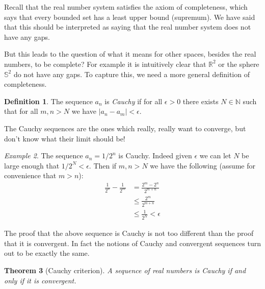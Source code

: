 \documentclass[11pt,oneside]{amsbook}
\newcommand{\NN}{\mathbb N}
\newcommand{\RR}{\mathbb R}
\theoremstyle{definition}
\theoremstyle{plain}
\newtheorem{thm}{Theorem}[section]
\theoremstyle{definition}
\newtheorem{defn}[thm]{Definition}
\theoremstyle{remark}
\newtheorem{example}[thm]{Example}
\numberwithin{equation}{section}
\numberwithin{figure}{section}
\begin{document}
Recall that the real number system satisfies the axiom of completeness, which says that every bounded set has a least upper bound (supremum). We have said that this should be interpreted as saying that the real number system does not have any gaps.

But this leads to the question of what it means for other spaces, besides the real numbers, to be complete? For example it is intuitively clear that $\RR^2$ or the sphere $\mathbb S^2$ do not have any gaps. To capture this, we need a more general definition of completeness.

\begin{defn}
  The sequence $a_n$ is \emph{Cauchy} if for all $\epsilon>0$ there exists $N\in\NN$ such that for all $m,n>N$ we have $|a_n-a_m|<\epsilon$.
\end{defn}

The Cauchy sequences are the ones which really, really want to converge, but don't know what their limit should be!

\begin{example}
  The sequence $a_n=1/2^n$ is Cauchy. Indeed given $\epsilon$ we can let $N$ be large enough that $1/2^N<\epsilon$. Then if $m,n>N$ we have the following (assume for convenience that $m>n$):
  \begin{align*}
    \frac1{2^n}-\frac1{2^m}&=\frac{2^m-2^n}{2^{m+n}}\\
    &\leq\frac{2^m}{2^{m+n}}\\
    &\leq\frac1{2^N}<\epsilon
  \end{align*}
\end{example}

The proof that the above sequence is Cauchy is not too different than the proof that it is convergent. In fact the notions of Cauchy and convergent sequences turn out to be exactly the same.

\begin{thm}[Cauchy criterion]
  A sequence of real numbers is Cauchy if and only if it is convergent.
\end{thm}
\end{document}
